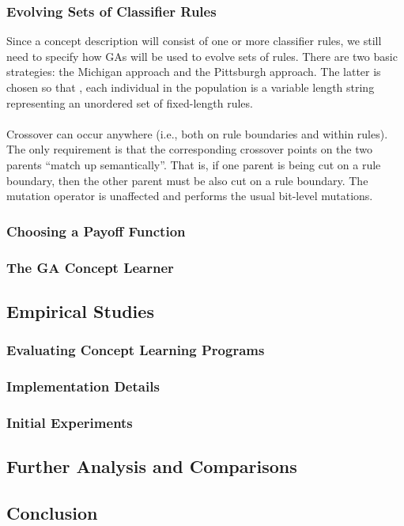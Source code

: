 \documentclass[../main.tex]{subfiles}
\begin{document}
\subsubsection{Evolving Sets of Classifier Rules}
Since a concept description will consist of one or more classifier rules, we still need to specify how GAs will be used
to evolve sets of rules. There are two basic strategies: the Michigan approach and the Pittsburgh approach. The latter
is chosen so that , each individual in the population is a variable length string representing an unordered set of
fixed-length rules.
\\\\
Crossover can occur anywhere (i.e., both on rule boundaries and within rules). The only requirement is that the
corresponding crossover points on the two parents ``match up semantically''. That is, if one parent is being cut on a
rule boundary, then the other parent must be also cut on a rule boundary. The mutation operator is unaffected and
performs the usual bit-level mutations.

\subsubsection{Choosing a Payoff Function}

\subsubsection{The GA Concept Learner}

\subsection{Empirical Studies}

\subsubsection{Evaluating Concept Learning Programs}

\subsubsection{Implementation Details}

\subsubsection{Initial Experiments}

\subsection{Further Analysis and Comparisons}

\subsection{Conclusion}
\end{document}
